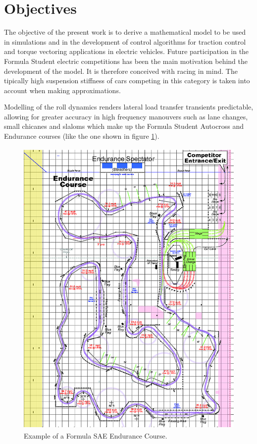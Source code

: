 \section{Objectives}
\label{sec:objectives}
The objective of the present work is to derive a mathematical model to be used  in simulations and in the development of control algorithms for traction control and torque vectoring applications in electric vehicles.
Future participation in the Formula Student electric competitions has been the main motivation behind the development of the model. It is therefore conceived with racing in mind. The tipically high suspension stiffness of cars competing in this category is taken into account when making approximations.

Modelling of the roll dynamics renders lateral load transfer transients predictable, allowing for greater accuracy in high frequency manouvers such as lane changes, small chicanes and slaloms which make up the Formula Student Autocross and Endurance courses (like the one shown in figure \ref{autox}).


\begin{figure}[tb]
  \centering
  \includegraphics[height=15cm]{images/autox}
  \caption{Example of a Formula SAE Endurance Course.}
  \label{autox}
\end{figure}

